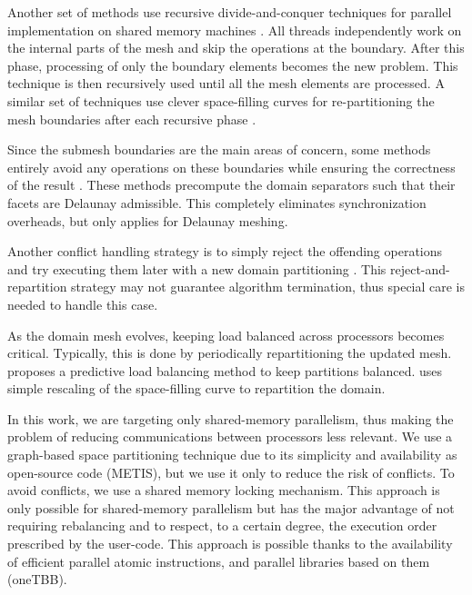 Another set of methods use recursive divide-and-conquer techniques for parallel implementation on shared memory machines \cite{marot2020quality}. All threads independently work on the internal parts of the mesh and skip the operations at the boundary. After this phase, processing of only the boundary elements becomes the new problem. This technique is then recursively used until all the mesh elements are processed. A similar set of techniques use clever space-filling curves for re-partitioning the mesh boundaries after each recursive phase \cite{chrisochoides2006parallel, aluru1997parallel}.
%

Since the submesh boundaries are the main areas of concern, some methods entirely avoid any operations on these boundaries while ensuring the correctness of the result \cite{galtier1996prepartitioning, linardakis2006delaunay}. These methods precompute the domain separators such that their facets are Delaunay admissible. This  completely eliminates synchronization overheads, but only applies for Delaunay meshing.
%

Another conflict handling strategy is to simply reject the offending operations
and try executing them later with a new domain partitioning \cite{marot2019one}.
This reject-and-repartition strategy may not guarantee algorithm termination,
thus special care is needed to handle this case.
%

As the domain mesh evolves, keeping load balanced across processors becomes
critical. Typically, this is done by periodically repartitioning the updated mesh.
\citet{zhou2012tools} proposes a predictive load balancing method to keep
partitions balanced. \citet{marot2019one} uses simple rescaling of the
space-filling curve to repartition the domain.

In this work, we are targeting only shared-memory parallelism, thus making the problem of reducing communications between processors less relevant. We use a graph-based space partitioning technique \cite{karypis1998fast} due to its simplicity and availability as open-source code (METIS), but we use it only to reduce the risk of conflicts. To avoid conflicts, we use a shared memory locking mechanism. This approach is only possible for shared-memory parallelism but has the major advantage of not requiring rebalancing and to respect, to a certain degree, the execution order prescribed by the user-code. This approach is possible thanks to the availability of efficient parallel atomic instructions, and parallel libraries based on them (oneTBB).



